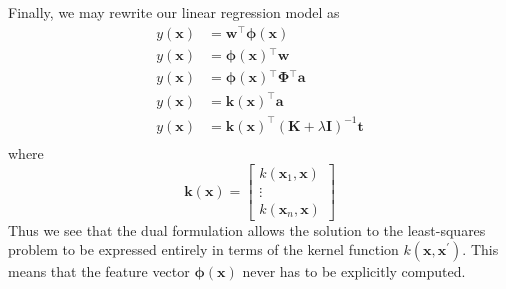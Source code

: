 \documentclass[12pt]{article}
\newcommand{\x}{\mathbf{x}}
\newcommand{\w}{\mathbf{w}}
\newcommand{\tVec}{\mathbf{t}}
\newcommand{\aVec}{\mathbf{a}}
\newcommand{\phiX}{\mathbf{\phi}\left(\x{}\right)}
\newcommand{\PhiMat}{\mathbf{\Phi}}
\newcommand{\K}{\mathbf{K}}
\newcommand{\I}{\mathbf{I}}
\begin{document}
%
Finally, we may rewrite our linear regression model as
%
\begin{align*}
  y\left(\x{}\right) &= \w{}^\top\phiX{}\\
  y\left(\x{}\right) &= \phiX{}^\top\w{}\\
  y\left(\x{}\right) &= \phiX{}^\top\PhiMat{}^\top\aVec{}\\
  y\left(\x{}\right) &= \mathbf{k}\left(\x{}\right)^\top\aVec{}\\
  y\left(\x{}\right) &= \mathbf{k}\left(\x{}\right)^\top\left(\K{} + \lambda\I{}\right)^{-1}\tVec{}\\
\end{align*}
%
where
%
\begin{equation*}
  \mathbf{k}\left(\x{}\right) = 
  \left[\begin{matrix}
    k\left(\x{}_1, \x{}\right)\\
    \vdots\\
    k\left(\x{}_n, \x{}\right)
  \end{matrix}\right]
\end{equation*}
%
Thus we see that the dual formulation allows the solution to the least-squares
problem to be expressed entirely in terms of the kernel function
$k\left(\x{}, \x{}^\prime\right)$. This means that the feature vector $\phiX{}$ never has
to be explicitly computed.
\end{document}
